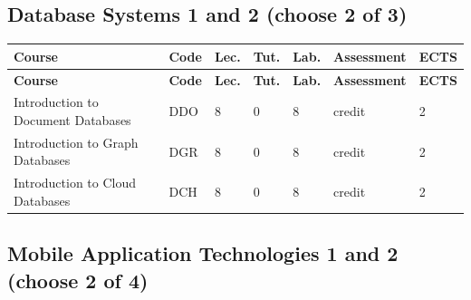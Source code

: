 \documentclass[12pt,a4paper]{article}
\newcommand{\thdrule}{\noalign{\global\setlength{\extrarowheight}{0pt}}}
\newcommand{\thdend}{\noalign{\global\setlength{\extrarowheight}{4pt}}}
\begin{document}
\subsection*{Database Systems 1 and 2 (choose 2 of 3)}

{\scriptsize
\begin{longtable}{m{5.5cm}m{0.8cm}m{1cm}m{1cm}m{1cm}m{1.7cm}m{0.7cm}}
\thdrule\toprule
\rowcolor{pjatkRed}
{\color{white}\footnotesize\textbf{\vphantom{Ag}Course}} & {\color{white}\footnotesize\textbf{\vphantom{Ag}Code}} & {\color{white}\footnotesize\textbf{\vphantom{Ag}Lec.}} & {\color{white}\footnotesize\textbf{\vphantom{Ag}Tut.}} & {\color{white}\footnotesize\textbf{\vphantom{Ag}Lab.}} & {\color{white}\footnotesize\textbf{\vphantom{Ag}Assessment}} & {\color{white}\footnotesize\textbf{\vphantom{Ag}ECTS}} \\
\midrule\thdend
\endfirsthead
\thdrule\toprule
\rowcolor{pjatkRed}
{\color{white}\footnotesize\textbf{\vphantom{Ag}Course}} & {\color{white}\footnotesize\textbf{\vphantom{Ag}Code}} & {\color{white}\footnotesize\textbf{\vphantom{Ag}Lec.}} & {\color{white}\footnotesize\textbf{\vphantom{Ag}Tut.}} & {\color{white}\footnotesize\textbf{\vphantom{Ag}Lab.}} & {\color{white}\footnotesize\textbf{\vphantom{Ag}Assessment}} & {\color{white}\footnotesize\textbf{\vphantom{Ag}ECTS}} \\
\midrule\thdend
\endhead
\rowcolor{tableRowLight} Introduction to Document Databases & DDO & 8 & 0 & 8 & {\scriptsize credit} & 2 \\
\rowcolor{tableRowAlt} Introduction to Graph Databases & DGR & 8 & 0 & 8 & {\scriptsize credit} & 2 \\
\rowcolor{tableRowLight} Introduction to Cloud Databases & DCH & 8 & 0 & 8 & {\scriptsize credit} & 2 \\
\bottomrule
\end{longtable}}

\subsection*{Mobile Application Technologies 1 and 2 (choose 2 of 4)}
\end{document}
